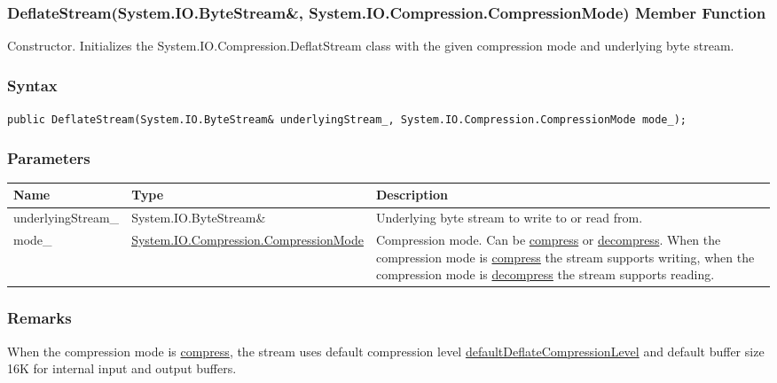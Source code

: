 \documentclass[a4paper,oneside,11.000000pt]{book}
\begin{document}
\hypertarget{System.IO.Compression.DeflateStream.constructor.P.System.IO.Compression.DeflateStream.R.System.IO.ByteStream.System.IO.Compression.CompressionMode}{\subsubsection*{DeflateStream(System.IO.ByteStream\&, System.IO.Compression.CompressionMode) Member Function}}
\begin{flushleft}
Constructor. Initializes the System.\-IO.\-Compression.\-DeflatStream class with the given compression mode and underlying byte stream.

\end{flushleft}
\subsubsection*{Syntax}
\texttt{public DeflateStream(System.IO.ByteStream\& underlyingStream\_, System.IO.Compression.CompressionMode mode\_);}
\subsubsection*{Parameters}
\begin{flushleft}
\begin{supertabular}[l]{!{\raggedright}p{4.10323cm}!{\raggedright}p{5.76344cm}!{\raggedright}p{4.93333cm}}
\textbf{Name}
& \textbf{Type}
& \textbf{Description}
\\
\hline
underlyingStream\_
& System.\-IO.\-ByteStream\&\-
& Underlying byte stream to write to or read from.

\\
mode\_
& \hyperlink{System.IO.Compression.CompressionMode}{System.\-IO.\-Compression.\-CompressionMode}
& Compression mode. Can be \hyperlink{System.IO.Compression.CompressionMode.compress}{compress} or \hyperlink{System.IO.Compression.CompressionMode.decompress}{decompress}.
When the compression mode is \hyperlink{System.IO.Compression.CompressionMode.compress}{compress} the stream supports writing,
when the compression mode is \hyperlink{System.IO.Compression.CompressionMode.decompress}{decompress} the stream supports reading.

\\
\end{supertabular}

\end{flushleft}
\subsubsection*{Remarks}
\begin{flushleft}
When the compression mode is \hyperlink{System.IO.Compression.CompressionMode.compress}{compress}, the stream uses default compression level \hyperlink{System.IO.Compression.defaultDeflateCompressionLevel}{defaultDeflateCompressionLevel}
and default buffer size 16K for internal input and output buffers.

\end{flushleft}
\clearpage
\end{document}
